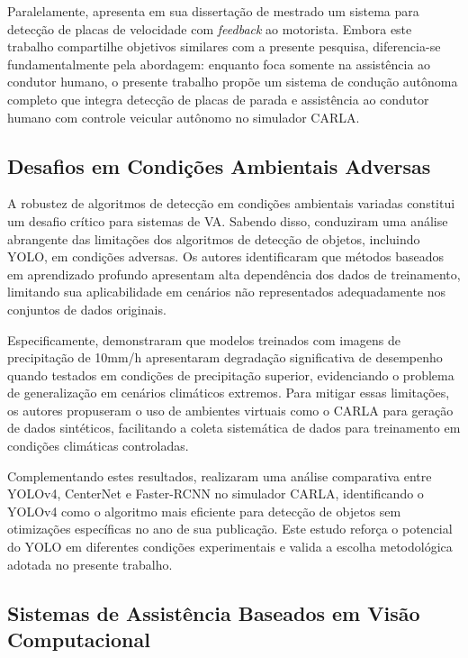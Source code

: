 Paralelamente,  apresenta em sua dissertação de mestrado um sistema para detecção de placas de velocidade com \textit{feedback} ao motorista. Embora este trabalho compartilhe objetivos similares com a presente pesquisa, diferencia-se fundamentalmente pela abordagem: enquanto  foca somente na assistência ao condutor humano, o presente trabalho propõe um sistema de condução autônoma completo que integra detecção de placas de parada e assistência ao condutor humano com controle veicular autônomo no simulador CARLA.

\subsection{Desafios em Condições Ambientais Adversas}

A robustez de algoritmos de detecção em condições ambientais variadas constitui um desafio crítico para sistemas de VA. Sabendo disso,  conduziram uma análise abrangente das limitações dos algoritmos de detecção de objetos, incluindo YOLO, em condições adversas. Os autores identificaram que métodos baseados em aprendizado profundo apresentam alta dependência dos dados de treinamento, limitando sua aplicabilidade em cenários não representados adequadamente nos conjuntos de dados originais.

Especificamente,  demonstraram que modelos treinados com imagens de precipitação de 10mm/h apresentaram degradação significativa de desempenho quando testados em condições de precipitação superior, evidenciando o problema de generalização em cenários climáticos extremos. Para mitigar essas limitações, os autores propuseram o uso de ambientes virtuais como o CARLA para geração de dados sintéticos, facilitando a coleta sistemática de dados para treinamento em condições climáticas controladas.

Complementando estes resultados,  realizaram uma análise comparativa entre YOLOv4, CenterNet e Faster-RCNN no simulador CARLA, identificando o YOLOv4 como o algoritmo mais eficiente para detecção de objetos sem otimizações específicas no ano de sua publicação. Este estudo reforça o potencial do YOLO em diferentes condições experimentais e valida a escolha metodológica adotada no presente trabalho.

\subsection{Sistemas de Assistência Baseados em Visão Computacional}

